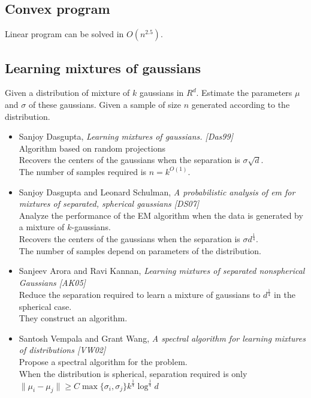 \documentclass[12pt]{article}
\begin{document}
\subsection{Convex program}
Linear program can be solved in $O(n^{2.5})$.

\subsection{Learning mixtures of gaussians}

Given a distribution of mixture of $k$ gaussians in $R^d$. Estimate the parameters $\mu$ and $\sigma$ of these gaussians. Given a sample of size $n$ generated according to the distribution.

\begin{itemize}
	\item Sanjoy Dasgupta, {\em Learning mixtures of gaussians. [Das99]}\\
	Algorithm based on random projections\\
	Recovers the centers of the gaussians when the separation is $\sigma \sqrt d$.\\
	The number of samples required is $n = k^{O(1)}$.
	
	\item Sanjoy Dasgupta and Leonard Schulman, {\em A probabilistic analysis of em for mixtures of separated, spherical gaussians [DS07]} \\
	Analyze the performance of the EM algorithm when the data is generated by a mixture of $k$-gaussians.\\
	Recovers the centers of the gaussians when the separation is $\sigma d^{\frac{1}{4}}$.\\
	The number of samples depend on parameters of the distribution.
	
	\item Sanjeev Arora and Ravi Kannan, {\em Learning mixtures of separated nonspherical Gaussians [AK05]}\\
	Reduce the separation required to learn a mixture of gaussians to $d^{\frac{1}{4}}$ in the spherical case.\\
	They construct an algorithm.
	
	\item Santosh Vempala and Grant Wang, {\em A spectral algorithm for learning mixtures of distributions [VW02]}\\
	Propose a spectral algorithm for the problem.\\
	When the distribution is spherical, separation required is only $\|\mu_i - \mu_j\| \ge C \max \{\sigma_i, \sigma_j \} k^{\frac{1}{4}}\log^{\frac{1}{4}}d$
	

\end{itemize}
\end{document}
